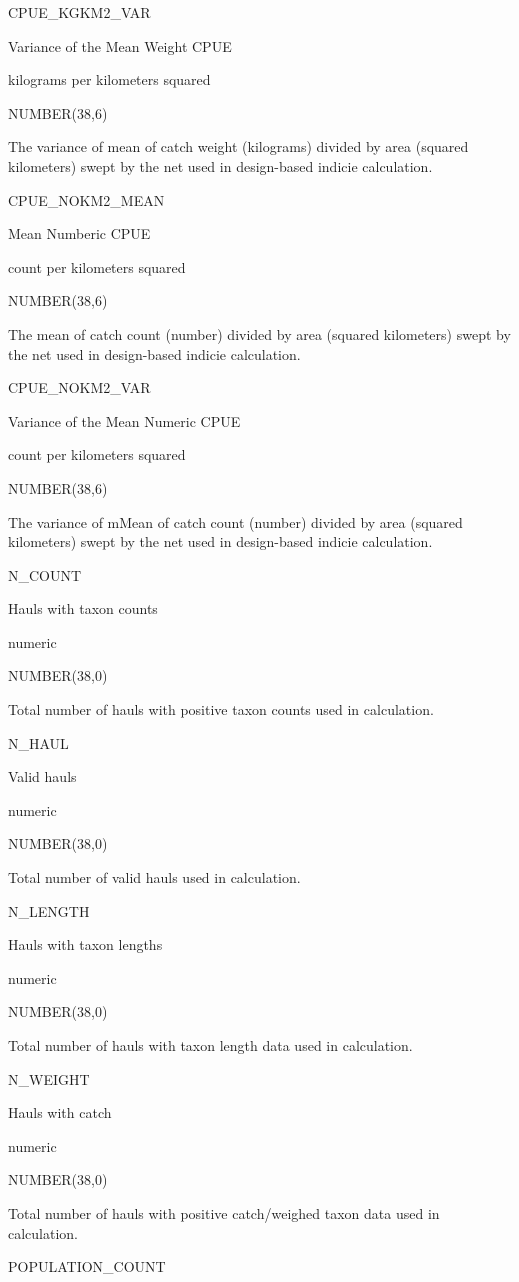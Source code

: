 \documentclass[
  letterpaper,
  oneside,
  open=any]{scrbook}
\begin{document}
CPUE\_KGKM2\_VAR

Variance of the Mean Weight CPUE

kilograms per kilometers squared

NUMBER(38,6)

The variance of mean of catch weight (kilograms) divided by area
(squared kilometers) swept by the net used in design-based indicie
calculation.

CPUE\_NOKM2\_MEAN

Mean Numberic CPUE

count per kilometers squared

NUMBER(38,6)

The mean of catch count (number) divided by area (squared kilometers)
swept by the net used in design-based indicie calculation.

CPUE\_NOKM2\_VAR

Variance of the Mean Numeric CPUE

count per kilometers squared

NUMBER(38,6)

The variance of mMean of catch count (number) divided by area (squared
kilometers) swept by the net used in design-based indicie calculation.

N\_COUNT

Hauls with taxon counts

numeric

NUMBER(38,0)

Total number of hauls with positive taxon counts used in calculation.

N\_HAUL

Valid hauls

numeric

NUMBER(38,0)

Total number of valid hauls used in calculation.

N\_LENGTH

Hauls with taxon lengths

numeric

NUMBER(38,0)

Total number of hauls with taxon length data used in calculation.

N\_WEIGHT

Hauls with catch

numeric

NUMBER(38,0)

Total number of hauls with positive catch/weighed taxon data used in
calculation.

POPULATION\_COUNT
\end{document}
